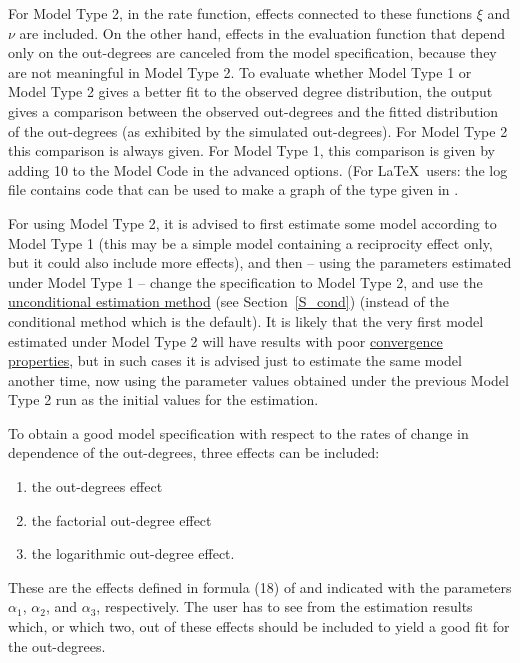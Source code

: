 \documentclass[a4paper,fleqn]{article}
\newcommand{\+}{\, + \,}
\begin{document}
{For Model Type 2, in the rate function, effects connected to these
functions $\xi$ and $\nu$ are included. On the other hand, effects
in the evaluation function that depend only on the out-degrees are
canceled from the model specification, because they are not
meaningful in Model Type 2. To evaluate whether Model Type 1 or
Model Type 2 gives a better fit to the observed degree distribution,
the output gives a comparison between the observed out-degrees and
the fitted distribution of the out-degrees (as exhibited by the
simulated out-degrees). For Model Type 2 this comparison is always
given. For Model Type 1, this comparison is given by adding 10 to the
Model Code in the advanced options. (For \LaTeX\ users: the log
file contains code that can be used to make a graph of the type
given in \citet{Snijders03}.

For using Model Type 2, it is advised to first estimate some model
according to Model Type 1 (this may be a simple model containing a
reciprocity effect only, but it could also include more effects),
and then -- using the parameters estimated under Model Type 1 --
change the specification to Model Type 2, and use the
\hyperlink{T_S_cond}{unconditional estimation method}
(see Section~\ref{S_cond}) (instead of the conditional method which is the
default). It is likely that the very first model estimated under
Model Type 2 will have results with poor
\hyperlink{T_convergence}{convergence properties}, but in such
cases it is advised just to estimate the same model another time,
now using the parameter values obtained under the previous Model
Type 2 run as the initial values for the estimation.

To obtain a good model specification with respect to the rates of
change in dependence of the out-degrees, three effects can be
included:
\begin{enumerate}
\item the out-degrees effect
\item the factorial out-degree effect
\item the logarithmic out-degree effect.
\end{enumerate}
These are the effects defined in formula (18) of \citet{Snijders03}
and indicated with the parameters $\alpha_1$, $\alpha_2$,
and $\alpha_3$, respectively.
The user has to see from the estimation results which, or which two,
out of these effects
should be included to yield a good fit for the out-degrees.
\medskip
\fi

}
\end{document}
